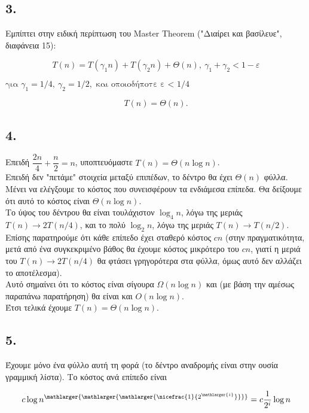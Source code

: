 		\subsection*{3.}
			Εμπίπτει στην ειδική περίπτωση του Master Theorem ("Διαίρει και βασίλευε", διαφάνεια 15):
			
			\[
				Τ(n) = T(γ_1n) + T(γ_2n) + Θ(n), \ γ_1 + γ_2 < 1 - ε 
			\]
			
				$\text{για } γ_1 = 1/4, \ γ_2 = 1/2, \text{ και οποιοδήποτε ε < 1/4}$
				
			
			\[
				T(n) = Θ(n).
			\]
		
		\subsection*{4.}
			Επειδή $\dfrac{2n}{4}+\dfrac{n}{2} = n $, υποπτευόμαστε $T(n) = Θ(n\log n)$. \\
			Επειδή δεν "πετάμε" στοιχεία μεταξύ επιπέδων, το δέντρο θα έχει $Θ(n)$ φύλλα. Μένει να ελέγξουμε το κόστος που συνεισφέρουν τα ενδιάμεσα επίπεδα. Θα δείξουμε ότι αυτό το κόστος είναι $Θ(n\log n)$. \\
			
			Το ύψος του δέντρου θα είναι τουλάχιστον $\log_4 n$, λόγω της μεριάς $T(n) \rightarrow 2T(n/4)$, και το πολύ $\log_2 n$, λόγω της μεριάς $T(n) \rightarrow T(n/2)$. \\
			
			Επίσης παρατηρούμε ότι κάθε επίπεδο έχει σταθερό κόστος $cn$ (στην πραγματικότητα, μετά από ένα συγκεκριμένο βάθος θα έχουμε κόστος μικρότερο του $cn$, γιατί η μεριά του $T(n) \rightarrow 2T(n/4)$ θα φτάσει γρηγορότερα στα φύλλα, όμως αυτό δεν αλλάζει το αποτέλεσμα). \\
			
			Αυτό σημαίνει ότι το κόστος είναι σίγουρα $Ω(n \log n)$ και (με βάση την αμέσως παραπάνω παρατήρηση) θα είναι και $O(n \log n)$. \\ 
			
			Έτσι τελικά έχουμε $T(n) = Θ(n \log n)$.
		\subsection*{5.}
			Έχουμε μόνο ένα φύλλο αυτή τη φορά (το δέντρο αναδρομής είναι στην ουσία γραμμική λίστα). Το κόστος ανά επίπεδο είναι 
			
			\[
				{{c\log n^{\mathlarger{\mathlarger{\mathlarger{\nicefrac{1}{2^\mathlarger{i}}}}}}  = c\frac{1}{2^i}\log n}}
			\]
			
